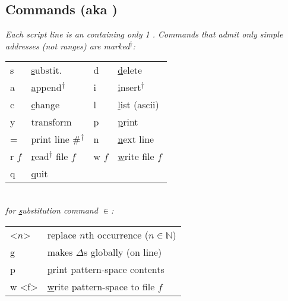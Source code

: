 \subsection*{Commands (aka )}
\textit{Each script line is an  containing only 1 . Commands that admit only simple addresses (not ranges) are marked\textsuperscript{$\dagger$}:}\\
\begin{tabular}{l l | l l}
    s       & \ul{s}ubstit.     &
    d       & \ul{d}elete           \\
    a       & \ul{a}ppend\textsuperscript{$\dagger$}           &
    i       & \ul{i}nsert\textsuperscript{$\dagger$}           \\
    c       & \ul{c}hange           &
    l       & \ul{l}ist (ascii)     \\
    y       & transform              &
    p       & \ul{p}rint            \\
    =       & print line \#\textsuperscript{$\dagger$}   &
    n       & \ul{n}ext line        \\
    r $f$   & \ul{r}ead\textsuperscript{$\dagger$} file $f$                        &
    w $f$   & \ul{w}rite file $f$   \\
    q       & \ul{q}uit             &
\end{tabular} \\

\vspace{1mm}
\textit{ for \ul{s}ubstitution command $\in$:}\\
\begin{tabular}{l l}
    <$n$> & replace $n$th occurrence ($n\in\mathbb{N}$) \\
    g           & makes $\Delta$s \ul{g}lobally (on line) \\
    p           & \ul{p}rint pattern-space contents \\
    w <f>       & \ul{w}rite pattern-space to file $f$\\
\end{tabular}


\begin{comment}
\begin{itemize}
    \item <n> \quad replace only 
    \item g \quad 
    \item p \quad 
    \item w <file> \quad 
\end{itemize}
\end{comment}

